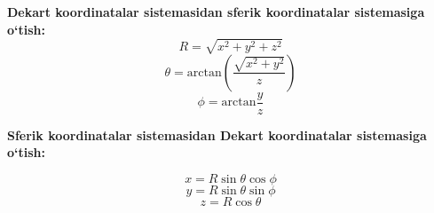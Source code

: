 \documentclass{article}
\begin{document}
\hspace{0.4cm}
\textbf{Dekart koordinatalar sistemasidan sferik koordinatalar sistemasiga o`tish:}
$$R = \sqrt{x^{2} + y^{2} + z^{2}}$$
$$\theta = \textrm{arctan}\left( \frac{\sqrt{x^{2} + y^{2}}}{z}\right) $$
$$ \phi = \textrm{arctan}\frac{y}{z} $$


\textbf{Sferik koordinatalar sistemasidan Dekart koordinatalar sistemasiga o`tish:}

$$x = R\sin{\theta}\cos{\phi}$$
$$y = R\sin{\theta}\sin{\phi}$$
$$z = R\cos{\theta}$$
\end{document}
